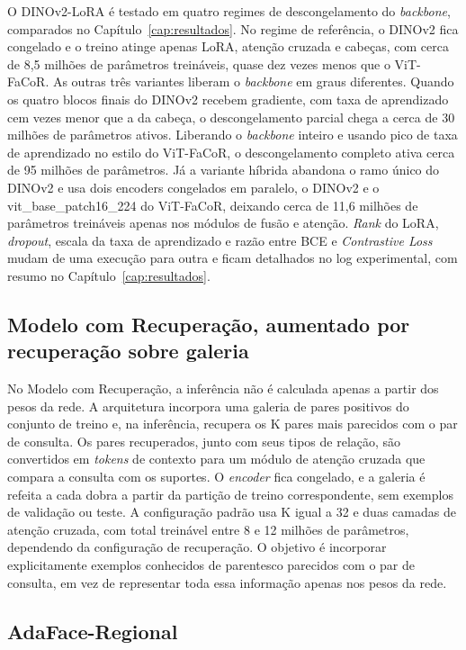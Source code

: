 O DINOv2-LoRA é testado em quatro regimes de descongelamento do \textit{backbone}, comparados no Capítulo~\ref{cap:resultados}. No regime de referência, o DINOv2 fica congelado e o treino atinge apenas LoRA, atenção cruzada e cabeças, com cerca de 8,5 milhões de parâmetros treináveis, quase dez vezes menos que o ViT-FaCoR. As outras três variantes liberam o \textit{backbone} em graus diferentes. Quando os quatro blocos finais do DINOv2 recebem gradiente, com taxa de aprendizado cem vezes menor que a da cabeça, o descongelamento parcial chega a cerca de 30 milhões de parâmetros ativos. Liberando o \textit{backbone} inteiro e usando pico de taxa de aprendizado no estilo do ViT-FaCoR, o descongelamento completo ativa cerca de 95 milhões de parâmetros. Já a variante híbrida abandona o ramo único do DINOv2 e usa dois encoders congelados em paralelo, o DINOv2 e o vit\_base\_patch16\_224 do ViT-FaCoR, deixando cerca de 11,6 milhões de parâmetros treináveis apenas nos módulos de fusão e atenção. \textit{Rank} do LoRA, \textit{dropout}, escala da taxa de aprendizado e razão entre BCE e \textit{Contrastive Loss} mudam de uma execução para outra e ficam detalhados no log experimental, com resumo no Capítulo~\ref{cap:resultados}.

\subsection{Modelo com Recuperação, aumentado por recuperação sobre galeria}

No Modelo com Recuperação, a inferência não é calculada apenas a partir dos pesos da rede. A arquitetura incorpora uma galeria de pares positivos do conjunto de treino e, na inferência, recupera os K pares mais parecidos com o par de consulta. Os pares recuperados, junto com seus tipos de relação, são convertidos em \textit{tokens} de contexto para um módulo de atenção cruzada que compara a consulta com os suportes. O \textit{encoder} fica congelado, e a galeria é refeita a cada dobra a partir da partição de treino correspondente, sem exemplos de validação ou teste. A configuração padrão usa K igual a 32 e duas camadas de atenção cruzada, com total treinável entre 8 e 12 milhões de parâmetros, dependendo da configuração de recuperação. O objetivo é incorporar explicitamente exemplos conhecidos de parentesco parecidos com o par de consulta, em vez de representar toda essa informação apenas nos pesos da rede.

\subsection{AdaFace-Regional}

